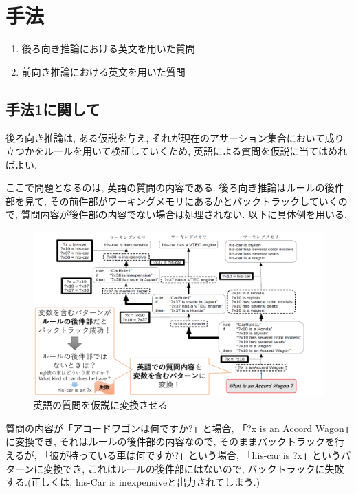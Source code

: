 \documentclass[uplatex,12pt]{jsarticle}
\begin{document}
\section{手法}
\begin{enumerate}
\item 後ろ向き推論における英文を用いた質問
\item 前向き推論における英文を用いた質問
\end{enumerate}

\subsection{手法1に関して}
後ろ向き推論は, ある仮説を与え, それが現在のアサーション集合において成り立つかをルールを用いて検証していくため, 英語による質問を仮説に当てはめればよい.

ここで問題となるのは, 英語の質問の内容である. 後ろ向き推論はルールの後件部を見て, その前件部がワーキングメモリにあるかとバックトラックしていくので, 質問内容が後件部の内容でない場合は処理されない. 以下に具体例を用いる.

\begin{figure}[htbp]
 \begin{center}
  \includegraphics[width = 12cm, pagebox = cropbox, clip]{images/後ろ向き推論_仮説の立て方.pdf}
 \end{center}
 \caption[]{英語の質問を仮説に変換させる}\label{fig:fig1.1}
\end{figure}

質問の内容が「アコードワゴンは何ですか?」と場合, 「?x is an Accord Wagon」に変換でき, それはルールの後件部の内容なので, そのままバックトラックを行えるが, 「彼が持っている車は何ですか?」という場合, 「his-car is ?x」というパターンに変換でき, これはルールの後件部にはないので, バックトラックに失敗する.(正しくは, his-Car is inexpensiveと出力されてしまう.)
\end{document}
